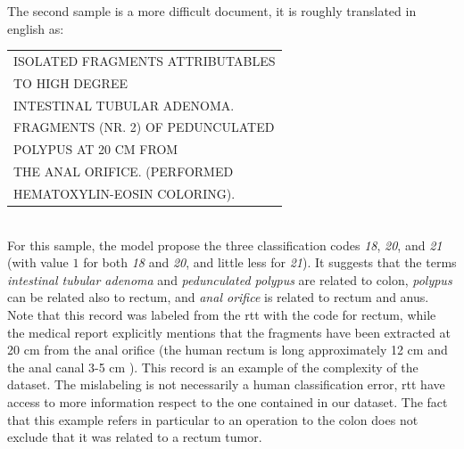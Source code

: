 The second sample is a more difficult
document, it is roughly translated in english as:\\
\begin{small}
  \ttfamily
  \begin{tabular}{l}
    ISOLATED FRAGMENTS ATTRIBUTABLES\\
    TO HIGH DEGREE\\
    INTESTINAL TUBULAR ADENOMA.\\
    FRAGMENTS (NR. 2) OF PEDUNCULATED\\
    POLYPUS AT 20 CM FROM\\
    THE ANAL ORIFICE. (PERFORMED\\
    HEMATOXYLIN-EOSIN COLORING).
\end{tabular}
\end{small}\\
For this sample, the model propose the three classification codes \emph{18},
\emph{20}, and \emph{21} (with value $1$ for both \emph{18} and
\emph{20}, and little less for \emph{21}). It suggests that the terms
\emph{intestinal tubular adenoma} and \emph{pedunculated polypus} are
related to colon, \emph{polypus} can be related also to rectum, and
\emph{anal orifice} is related to rectum and anus. Note that this
record was labeled from the \ac{rtt} with the code for rectum, while
the medical report 
explicitly mentions that the fragments have been extracted at 20 cm
from the anal orifice (the human rectum is long approximately 12 cm
and the anal canal 3-5 cm \cite{greene2006ajcc}). This record is an
example of the complexity of the dataset. The mislabeling is not
necessarily a human classification error, \ac{rtt} have access to more
information respect to the one contained in our dataset. The fact that
this example refers in particular to an operation to the colon does not
exclude that it was related to a rectum tumor.

